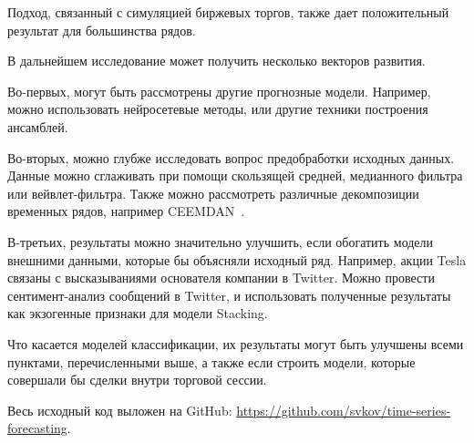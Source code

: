 \documentclass[a4paper,article,14pt]{extarticle}
\begin{document}
\par
Подход, связанный с симуляцией биржевых торгов, также дает положительный результат для большинства рядов.

\par
В дальнейшем исследование может получить несколько векторов развития.
\par
Во-первых, могут быть рассмотрены другие прогнозные модели.
Например, можно использовать нейросетевые методы, или другие техники построения ансамблей.
\par
Во-вторых, можно глубже исследовать вопрос предобработки исходных данных.
Данные можно сглаживать при помощи скользящей средней, медианного фильтра или вейвлет-фильтра.
Также можно рассмотреть различные декомпозиции временных рядов, например CEEMDAN~\cite{lstm_ex2}.
\par
В-третьих, результаты можно значительно улучшить, если обогатить модели внешними данными, которые бы объясняли исходный ряд.
Например, акции Tesla связаны с высказываниями основателя компании в Twitter.
Можно провести сентимент-анализ сообщений в Twitter, и использовать полученные результаты как экзогенные признаки для модели Stacking.

Что касается моделей классификации, их результаты могут быть улучшены всеми пунктами, перечисленными выше, а также если строить модели, которые совершали бы сделки внутри торговой сессии.


Весь исходный код выложен на GitHub: \url{https://github.com/svkov/time-series-forecasting}.
\pagebreak
\end{document}
